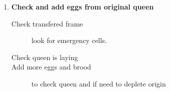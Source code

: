 \begin{enumerate}
\item \textbf{Check and add eggs from original queen}

\begin{description}
  \item[Check transfered frame] look for emergency cells.
  \item[Check queen is laying] 
  \item[Add more eggs and brood] to check queen and if need to deplete origin
\end{description}



\end{enumerate}




